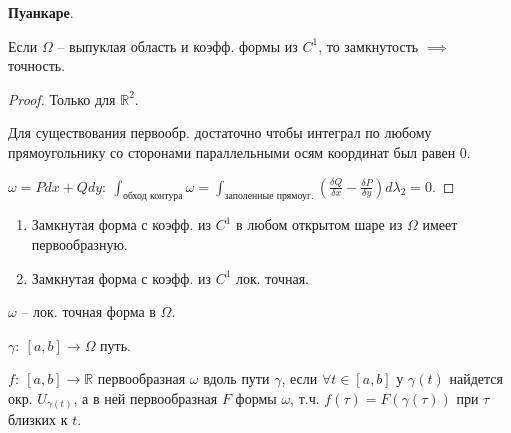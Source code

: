 \begin{lemma}
    \textbf{Пуанкаре}.

    Если $\Omega$ -- выпуклая область и коэфф. формы из $C^1$, то замкнутость $\implies$ точность.
\end{lemma}
\begin{proof}
    Только для $\mathbb{R}^2$.

    Для существования первообр. достаточно чтобы интеграл по любому прямоугольнику со сторонами параллельными осям координат был равен 0.
    
    $\omega = P dx + Q dy: \ \int_{\text{обход контура}} { \omega } = \int_{\text{заполенные прямоуг.}} { (\frac{\delta Q}{\delta x} - \frac{\delta P}{\delta y}) d \lambda_2} = 0$.
\end{proof}

\begin{consequence}
    \begin{enumerate}
        \item {
            Замкнутая форма с коэфф. из $C^1$ в любом открытом шаре из $\Omega$ имеет первообразную.
        }
        \item {
            Замкнутая форма с коэфф. из $C^1$ лок. точная.
        }
    \end{enumerate}
\end{consequence}
\begin{definition}
    $\omega$ -- лок. точная форма в $\Omega$.

    $\gamma: \ [a, b] \rightarrow \Omega$ путь.

    $f: \ [a, b] \rightarrow \mathbb{R}$ первообразная $\omega$ вдоль пути $\gamma$, если $\forall t \in [a, b]$ у $\gamma(t)$ найдется окр. $U_{\gamma(t)}$, а в ней первообразная $F$ формы $\omega$, т.ч. $f(\tau) = F(\gamma(\tau))$ при $\tau$ близких к $t$.
\end{definition}

